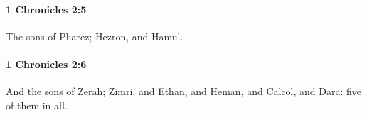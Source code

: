 		\paragraph{1 Chronicles 2:5} %
			\label{1CHRONICLES-2-5}

			The sons of Pharez; Hezron, and Hamul.


		\paragraph{1 Chronicles 2:6} %
			\label{1CHRONICLES-2-6}

			And the sons of Zerah; Zimri, and Ethan, and Heman, and Calcol, and Dara: five of them in all.



